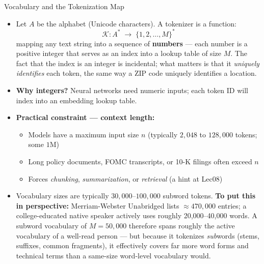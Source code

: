 \documentclass[10pt,english,aspectratio=169]{beamer}
\begin{document}
\begin{frame}{Vocabulary and the Tokenization Map}
\begin{itemize}
\item Let $A$ be the alphabet (Unicode characters). A tokenizer is a function:
\[
   \mathcal{K}\colon A^{*} \;\longrightarrow\; \{1, 2, \ldots, M\}^{*}
\]
mapping any text string into a sequence of \textbf{numbers} --- each number is a positive integer that serves as an index into a lookup table of size $M$. The fact that the index is an integer is incidental; what matters is that it \emph{uniquely identifies} each token, the same way a ZIP code uniquely identifies a location.

\medskip
\item \textbf{Why integers?} Neural networks need numeric inputs; each token ID will index into an embedding lookup table.

\medskip
\item \textbf{Practical constraint --- context length:}
\begin{itemize}
    \item Models have a maximum input size $n$ (typically $2{,}048$ to $128{,}000$ tokens; some $1$M)
    \item Long policy documents, FOMC transcripts, or 10-K filings often exceed $n$
    \item Forces \emph{chunking}, \emph{summarization}, or \emph{retrieval} (a hint at Lec08)
\end{itemize}

\medskip
\item Vocabulary sizes are typically $30{,}000$--$100{,}000$ subword tokens. \textbf{To put this in perspective:} Merriam-Webster Unabridged lists $\approx470{,}000$ entries; a college-educated native speaker actively uses roughly 20{,}000--40{,}000 words. A subword vocabulary of $M=50{,}000$ therefore spans roughly the active vocabulary of a well-read person --- but because it tokenizes \emph{sub}words (stems, suffixes, common fragments), it effectively covers far more word forms and technical terms than a same-size word-level vocabulary would.
\end{itemize}
\end{frame}
\end{document}
